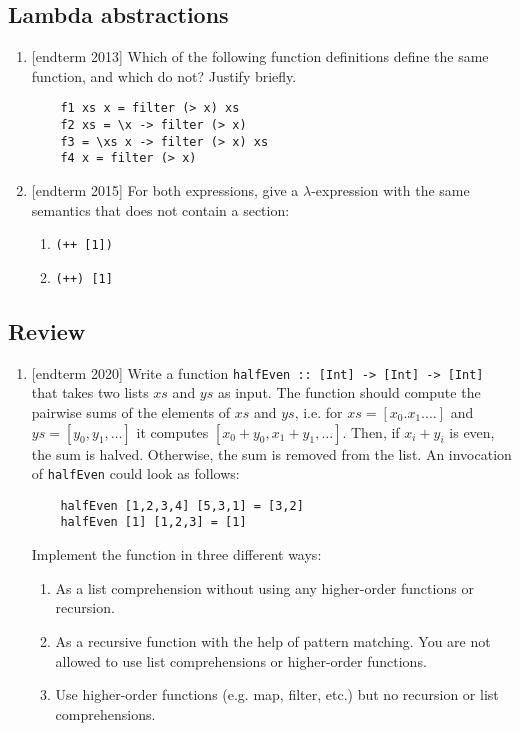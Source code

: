 \documentclass{article}
\begin{document}
\subsection{Lambda abstractions}
\begin{enumerate}
\item {[endterm 2013]} Which of the following function definitions define the same function, and which do not? Justify briefly.
\begin{verbatim}
    f1 xs x = filter (> x) xs
    f2 xs = \x -> filter (> x)
    f3 = \xs x -> filter (> x) xs
    f4 x = filter (> x)
\end{verbatim}

\item {[endterm 2015]} For both expressions, give a $\lambda$-expression with the same semantics that does not contain a section:
\begin{enumerate}
\item \verb|(++ [1])|
\item \verb|(++) [1]|
\end{enumerate}
\end{enumerate}

\subsection{Review}
\begin{enumerate}
\item {[endterm 2020]} Write a function \verb|halfEven :: [Int] -> [Int] -> [Int]| that takes two lists $xs$ and $ys$ as input. The function should compute the pairwise sums of the elements of $xs$ and $ys$, i.e. for $xs = [x_0. x_1. \dots]$ and $ys = [y_0, y_1, \dots]$ it computes $[x_0 + y_0, x_1 + y_1, \dots]$. Then, if $x_i + y_i$ is even, the sum is halved. Otherwise, the sum is removed from the list. An invocation of \verb|halfEven| could look as follows:
\begin{verbatim}
    halfEven [1,2,3,4] [5,3,1] = [3,2]
    halfEven [1] [1,2,3] = [1]
\end{verbatim}
Implement the function in three different ways:
\begin{enumerate}
\item As a list comprehension without using any higher-order functions or recursion.
\item As a recursive function with the help of pattern matching. You are not allowed to use list comprehensions or higher-order functions.
\item Use higher-order functions (e.g. map, filter, etc.) but no recursion or list comprehensions.
\end{enumerate}
\end{enumerate}
\end{document}
